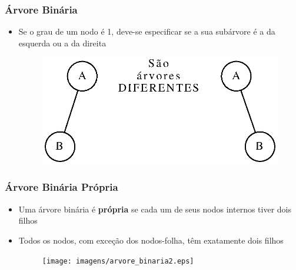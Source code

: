 \documentclass[aspectratio=169]{beamer}
\begin{document}
\begin{frame}[fragile]\frametitle{Árvore Binária}
\begin{itemize}
	\item Se o grau de um nodo é 1, deve-se especificar se a sua subárvore é a da esquerda ou a da direita
\begin{figure}[h]
	\centering
	\includegraphics[height=0.35\paperheight]{imagens/arvores_binarias_diferentes.eps}
\end{figure}
\end{itemize}
\end{frame}

\begin{frame}[fragile]\frametitle{Árvore Binária Própria}
\begin{itemize}
	\item Uma árvore binária é \textbf{própria} se cada um de seus nodos internos tiver dois filhos
	\item Todos os nodos, com exceção dos nodos-folha, têm exatamente dois filhos
\begin{figure}[h]
	\centering
	\texttt{[image: imagens/arvore\_binaria2.eps]}
\end{figure}
\end{itemize}
\end{frame}
\end{document}
